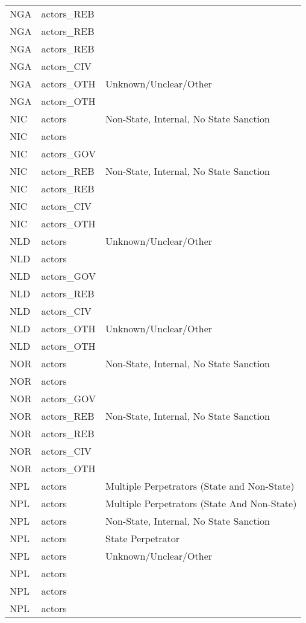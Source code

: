\begin{table}[ht]
\begin{tabular}{lll}
  NGA & actors\_REB &  \\ 
  NGA & actors\_REB &  \\ 
  NGA & actors\_REB &  \\ 
  NGA & actors\_CIV &  \\ 
  NGA & actors\_OTH & Unknown/Unclear/Other \\ 
  NGA & actors\_OTH &  \\ 
  NIC & actors & Non-State, Internal, No State Sanction \\ 
  NIC & actors &  \\ 
  NIC & actors\_GOV &  \\ 
  NIC & actors\_REB & Non-State, Internal, No State Sanction \\ 
  NIC & actors\_REB &  \\ 
  NIC & actors\_CIV &  \\ 
  NIC & actors\_OTH &  \\ 
  NLD & actors & Unknown/Unclear/Other \\ 
  NLD & actors &  \\ 
  NLD & actors\_GOV &  \\ 
  NLD & actors\_REB &  \\ 
  NLD & actors\_CIV &  \\ 
  NLD & actors\_OTH & Unknown/Unclear/Other \\ 
  NLD & actors\_OTH &  \\ 
  NOR & actors & Non-State, Internal, No State Sanction \\ 
  NOR & actors &  \\ 
  NOR & actors\_GOV &  \\ 
  NOR & actors\_REB & Non-State, Internal, No State Sanction \\ 
  NOR & actors\_REB &  \\ 
  NOR & actors\_CIV &  \\ 
  NOR & actors\_OTH &  \\ 
  NPL & actors & Multiple Perpetrators (State and Non-State) \\ 
  NPL & actors & Multiple Perpetrators (State And Non-State) \\ 
  NPL & actors & Non-State, Internal, No State Sanction \\ 
  NPL & actors & State Perpetrator \\ 
  NPL & actors & Unknown/Unclear/Other \\ 
  NPL & actors &  \\ 
  NPL & actors &  \\ 
  NPL & actors &  \\ 

\end{tabular}
\end{table}
